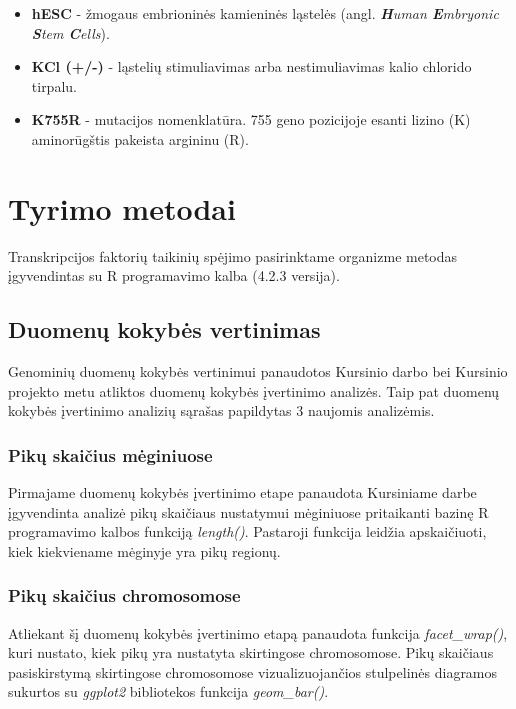 \documentclass[12pt]{article}
\begin{document}
\begin{itemize}
    \item \textbf{hESC} - žmogaus embrioninės kamieninės ląstelės
          (angl. \emph{\textbf{H}uman \textbf{E}mbryonic \textbf{S}tem
          \textbf{C}ells}).
    \item \textbf{KCl (+/-)} - ląstelių stimuliavimas arba nestimuliavimas kalio
          chlorido tirpalu.
    \item \textbf{K755R} - mutacijos nomenklatūra. 755 geno pozicijoje esanti
          lizino (K) aminorūgštis pakeista argininu (R).
\end{itemize}

\newpage


\section{Tyrimo metodai}
Transkripcijos faktorių taikinių spėjimo pasirinktame organizme metodas
įgyvendintas su R programavimo kalba\cite{R} (4.2.3 versija).

\subsection{Duomenų kokybės vertinimas}
Genominių duomenų kokybės vertinimui panaudotos Kursinio darbo bei Kursinio
projekto metu atliktos duomenų kokybės įvertinimo analizės. Taip pat
duomenų kokybės įvertinimo analizių sąrašas papildytas 3 naujomis analizėmis.

\subsubsection*{Pikų skaičius mėginiuose}
Pirmajame duomenų kokybės įvertinimo etape panaudota Kursiniame darbe
įgyvendinta analizė pikų skaičiaus nustatymui mėginiuose pritaikanti bazinę R
programavimo kalbos funkciją \emph{length()}. Pastaroji funkcija leidžia
apskaičiuoti, kiek kiekviename mėginyje yra pikų regionų.

\subsubsection*{Pikų skaičius chromosomose}
Atliekant šį duomenų kokybės įvertinimo etapą panaudota funkcija
\emph{facet\_wrap()}, kuri nustato, kiek pikų yra nustatyta skirtingose
chromosomose. Pikų skaičiaus pasiskirstymą skirtingose chromosomose
vizualizuojančios stulpelinės diagramos sukurtos su \emph{ggplot2}\cite{GGPLOT2}
bibliotekos funkcija \emph{geom\_bar()}.
\end{document}
